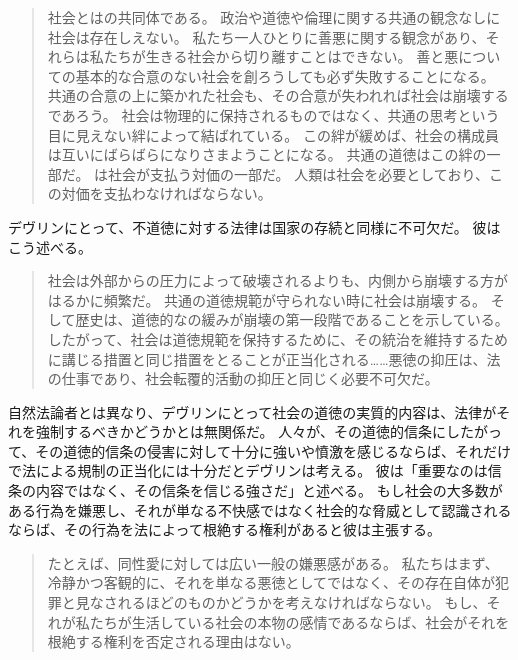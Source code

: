 \documentclass[paper=a4,book,openany]{jlreq}
\newcommand{\ig}[1]{}           %
\begin{document}
\begin{quote}
社会とはの共同体である。
政治や道徳や倫理に関する共通の観念なしに社会は存在しえない。
私たち一人ひとりに善悪に関する観念があり、それらは私たちが生きる社会から切り離すことはできない。
善と悪についての基本的な合意のない社会を創ろうしても必ず失敗することになる。
共通の合意の上に築かれた社会も、その合意が失われれば社会は崩壊するであろう。
社会は物理的に保持されるものではなく、共通の思考という目に見えない絆によって結ばれている。
この絆が緩めば、社会の構成員は互いにばらばらになりさまようことになる。
共通の道徳はこの絆の一部だ。
は社会が支払う対価の一部だ。
人類は社会を必要としており、この対価を支払わなければならない。
\citep[p.10]{devlin65:_enfor_moral}
\end{quote}

デヴリン\ig{Patrick Devlin}にとって、不道徳に対する法律は国家の存続と同様に不可欠だ。
彼はこう述べる。

\begin{quote}
社会は外部からの圧力によって破壊されるよりも、内側から崩壊する方がはるかに頻繁だ。
共通の道徳規範が守られない時に社会は崩壊する。
そして歴史は、道徳的なの緩みが崩壊の第一段階であることを示している。
したがって、社会は道徳規範を保持するために、その統治を維持するために講じる措置と同じ措置をとることが正当化される……悪徳の抑圧は、法の仕事であり、社会転覆的活動の抑圧と同じく必要不可欠だ。
\citep[p.36]{devlin65:_enfor_moral}
\end{quote}

自然法論者とは異なり、デヴリン\ig{Patrick Devlin}にとって社会の道徳の実質的内容は、法律がそれを強制するべきかどうかとは無関係だ。
人々が、その道徳的信条にしたがって、その道徳的信条の侵害に対して十分に強いや憤激を感じるならば、それだけで法による規制の正当化には十分だとデヴリン\ig{Patrick Devlin}は考える。
彼は「重要なのは信条の内容ではなく、その信条を信じる強さだ」と述べる。
もし社会の大多数がある行為を嫌悪し、それが単なる不快感ではなく社会的な脅威として認識されるならば、その行為を法によって根絶する権利があると彼は主張する。

\begin{quote}
たとえば、同性愛に対しては広い一般の嫌悪感がある。
私たちはまず、冷静かつ客観的に、それを単なる悪徳としてではなく、その存在自体が犯罪と見なされるほどのものかどうかを考えなければならない。
もし、それが私たちが生活している社会の本物の感情であるならば、社会がそれを根絶する権利を否定される理由はない\citep[p.40]{devlin65:_enfor_moral}。
\end{quote}
\end{document}
